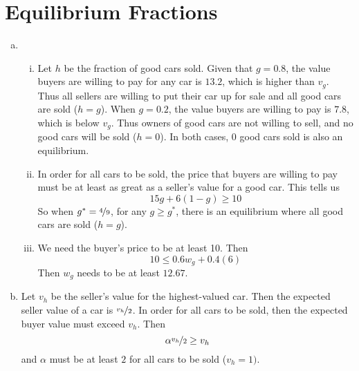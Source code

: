 \documentclass[12pt]{article}
\begin{document}
 

\section{Equilibrium Fractions}
\begin{enumerate}[(a)]
\item
\begin{enumerate}[i.]
\item Let $h$ be the fraction of good cars sold. Given that $g = 0.8$, the value buyers are willing to pay for any car is $13.2$, which is higher than $v_g$. Thus all sellers are willing to put their car up for sale and all good cars are sold ($h = g$). When $g = 0.2$, the value buyers are willing to pay is $7.8$, which is below $v_g$. Thus owners of good cars are not willing to sell, and no good cars will be sold ($h = 0$). In both cases, 0 good cars sold is also an equilibrium.

\item In order for all cars to be sold, the price that buyers are willing to pay must be at least as great as a seller's value for a good car. This tells us
\[15 g + 6(1 - g) \geq 10\]
So when $g^* = \nicefrac{4}{9}$, for any $g \geq g^*$, there is an equilibrium where all good cars are sold ($h = g$).

\item We need the buyer's price to be at least 10. Then
\[ 10 \leq 0.6 w_g + 0.4(6)\]
Then $w_g$ needs to be at least $12.67$.
\end{enumerate}

\item Let $v_h$ be the seller's value for the highest-valued car. Then the expected seller value of a car is $\nicefrac{v_h}{2}$. In order for all cars to be sold, then the expected buyer value must exceed $v_h$. Then
\[\alpha \nicefrac{v_h}{2} \geq v_h\]
and $\alpha$ must be at least $2$ for all cars to be sold ($v_h = 1)$.  
\end{enumerate}
\end{document}
